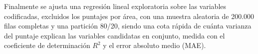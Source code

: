         \vspace{10pt}

        

        \vspace{10pt}

        Finalmente se ajusta una regresión lineal exploratoria sobre las
        variables codificadas, excluidos los puntajes por área, con una muestra
        aleatoria de 200.000 filas completas y una partición 80/20, siendo 
        una cota rápida de cuánta varianza del puntaje explican las variables 
        candidatas en conjunto, medida con el coeficiente de determinación 
        $R^2$ y el error absoluto medio (MAE).

        \vspace{10pt}

        